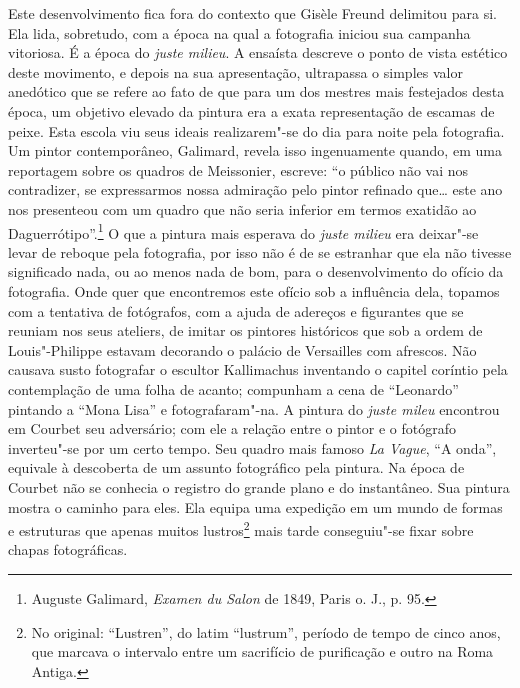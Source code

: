Este desenvolvimento fica fora do contexto que Gisèle Freund delimitou
para si. Ela lida, sobretudo, com a época na qual a fotografia iniciou
sua campanha vitoriosa. É a época do \emph{juste milieu}. A ensaísta
descreve o ponto de vista estético deste movimento, e depois na sua
apresentação, ultrapassa o simples valor anedótico que se refere ao fato
de que para um dos mestres mais festejados desta época, um objetivo
elevado da pintura era a exata representação de escamas de peixe. Esta
escola viu seus ideais realizarem"-se do dia para noite pela fotografia.
Um pintor contemporâneo, Galimard, revela isso ingenuamente quando, em
uma reportagem sobre os quadros de Meissonier, escreve: ``o público não
vai nos contradizer, se expressarmos nossa admiração pelo pintor
refinado que\ldots{} este ano nos presenteou com um quadro que não seria
inferior em termos exatidão ao Daguerrótipo''.\footnote{Auguste Galimard,
  \emph{Examen du Salon} de 1849, Paris o. J., p. 95.} O que a pintura
mais esperava do \emph{juste milieu} era deixar"-se levar de reboque pela
fotografia, por isso não é de se estranhar que ela não tivesse
significado nada, ou ao menos nada de bom, para o desenvolvimento do
ofício da fotografia. Onde quer que encontremos este ofício sob a
influência dela, topamos com a tentativa de fotógrafos, com a ajuda de
adereços e figurantes que se reuniam nos seus ateliers, de imitar os
pintores históricos que sob a ordem de Louis"-Philippe estavam decorando
o palácio de Versailles com afrescos. Não causava susto fotografar o
escultor Kallimachus inventando o capitel coríntio pela contemplação de
uma folha de acanto; compunham a cena de ``Leonardo'' pintando a ``Mona
Lisa'' e fotografaram"-na. A pintura do \emph{juste mileu} encontrou em
Courbet seu adversário; com ele a relação entre o pintor e o fotógrafo
inverteu"-se por um certo tempo. Seu quadro mais famoso \emph{La Vague},
``A onda'', equivale à descoberta de um assunto fotográfico pela
pintura. Na época de Courbet não se conhecia o registro do grande plano
e do instantâneo. Sua pintura mostra o caminho para eles. Ela equipa uma
expedição em um mundo de formas e estruturas que apenas muitos
lustros\footnote{No original: ``Lustren'', do latim ``lustrum'',
  período de tempo de cinco anos, que marcava o intervalo entre um
  sacrifício de purificação e outro na Roma Antiga. \versal{[N. T.]}} mais tarde
conseguiu"-se fixar sobre chapas fotográficas.

